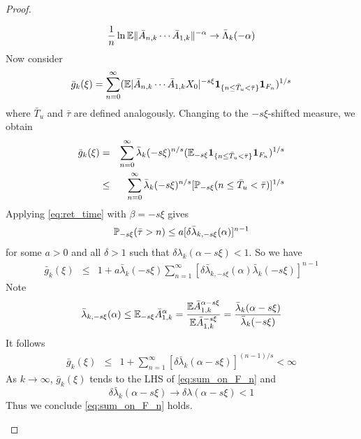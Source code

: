 \documentclass[aoas,preprint]{imsart}
\numberwithin{equation}{section}
\theoremstyle{plain}
\begin{document}
\begin{proof}
\begin{enumerate}
\begin{equation*}
      {1 \over n} \ln \E \|\bar A_{n,k} \cdots \bar A_{1,k}\|^{-\alpha}
      \to
      \bar \Lambda_{k}(-\alpha)
    \end{equation*}
    Now consider
    \begin{eqnarray*}
      \bar g_k(\xi) = \sum_{n=0}^\infty
      (\E |\bar A_{n,k} \cdots \bar A_{1,k} X_0|^{-s\xi}
      \1{n \leq \bar T_u < \bar \tau}
      \I_{F_n}
      )^{1/s}
    \end{eqnarray*}
    where $\bar T_u$ and $\bar \tau$ are defined analogously. Changing
    to the $-s\xi$-shifted measure, we obtain
    \begin{eqnarray*}
      \bar g_k(\xi) &=& \sum_{n=0}^\infty \bar \lambda_{k}(-s\xi)^{n/s}
      (\E_{-s\xi} \1{n \leq \bar T_u < \bar \tau} \I_{F_n})^{1/s} \\
      &\leq&
      \sum_{n=0}^\infty \bar \lambda_{k}(-s\xi)^{n/s}
      [\P_{-s\xi}(n \leq \bar T_u < \bar \tau)]^{1/s}
    \end{eqnarray*}
    Applying \eqref{eq:ret_time} with $\beta = -s\xi$ gives
    \begin{eqnarray*}
      \P_{-s\xi}(\bar \tau > n) \leq a [\delta \bar \lambda_{k, -s\xi}(\alpha)]^{n-1}
    \end{eqnarray*}
    for some $a > 0$ and all $\delta > 1$ such that
    $\delta \lambda_k(\alpha - s\xi) < 1$. So we have
    \begin{eqnarray*}
      \bar g_k(\xi) &\leq& 1 + a \bar \lambda_k(-s\xi)\sum_{n=1}^\infty
      [\delta \bar \lambda_{k, -s\xi}(\alpha) \bar \lambda_k(-s\xi)]^{n-1} 
    \end{eqnarray*}
    Note
    \begin{eqnarray*}
      \bar \lambda_{k, -s\xi}(\alpha)
      \leq
      \E_{-s\xi} \bar A_{1,k}^\alpha 
      = {
        \E \bar A_{1,k}^{\alpha - s\xi}
        \over
        \E \bar A_{1,k}^{-s\xi}
      }
      = {
        \bar \lambda_k(\alpha - s\xi)
        \over
        \bar \lambda_k(-s\xi)
      }
    \end{eqnarray*}
    It follows
    \begin{eqnarray*}
      \bar g_k(\xi) &\leq& 1 + \sum_{n=1}^\infty
      [\delta \bar \lambda_k(\alpha - s\xi)]^{(n-1)/s}
      < \infty
    \end{eqnarray*}
    As $k \to \infty$, $\bar g_k(\xi)$ tends to the LHS of
    \eqref{eq:sum_on_F_n} and
    \[
    \delta \bar \lambda_k(\alpha - s\xi) \to \delta \lambda(\alpha - s\xi)
    < 1
    \]
    Thus we conclude \eqref{eq:sum_on_F_n} holds.
    \end{enumerate}
\end{proof}
\end{document}
